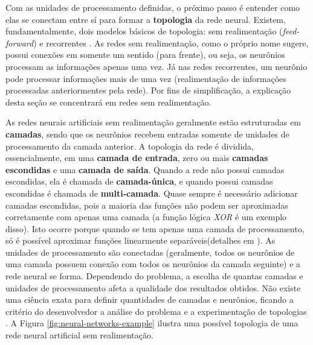 Com as unidades de processamento definidas, o próximo passo é entender como elas
se conectam entre sí para formar a \textbf{topologia} da rede neural. Existem,
fundamentalmente, dois modelos básicos de topologia: sem realimentação
(\textit{feed-forward}) e recorrentes \cite[Cap. 18]{RussellNorvig200912}. As
redes sem realimentação, como o próprio nome sugere, possui conexões em somente
um sentido (para frente), ou seja, os neurônios processam as informações apenas
uma vez. Já nas redes recorrentes, um neurônio pode processar informações mais
de uma vez (realimentação de informações processadas anteriormentes pela rede).
Por fins de simplificação, a explicação desta seção se concentrará em redes sem
realimentação.

As redes neurais artificiais sem realimentação geralmente estão estruturadas em
\textbf{camadas}, sendo que os neurônios recebem entradas somente de unidades de
processamento da camada anterior. A topologia da rede é dividida,
essencialmente, em uma \textbf{camada de entrada}, zero ou mais \textbf{camadas
escondidas} e uma \textbf{camada de saída}. Quando a rede não possui camadas
escondidas, ela é chamada de \textbf{camada-única}, e quando possui camadas
escondidas é chamada de \textbf{multi-camada}. Quase sempre é necessário
adicionar camadas escondidas, pois a maioria das funções não podem ser
aproximadas corretamente com apenas uma camada (a função lógica \textit{XOR} é
um exemplo disso). Isto ocorre porque quando se tem apenas uma camada de
processamento, só é possível aproximar funções linearmente separáveis(detalhes
em \cite[Cap. 18]{RussellNorvig200912}). As unidades de processamento são
conectadas (geralmente, todos os neurônios de uma camada possuem conexão com
todos os neurônios da camada seguinte) e a rede neural se forma. Dependendo do
problema, a escolha de quantas camadas e unidades de processamento afeta a
qualidade dos resultados obtidos. Não existe uma ciência exata para definir
quantidades de camadas e neurônios, ficando a critério do desenvolvedor a
análise do problema e a experimentação de topologias \cite[Cap.
18]{RussellNorvig200912}. A Figura \ref{fig:neural-networks-example} ilustra uma
possível topologia de uma rede neural artificial sem realimentação.

